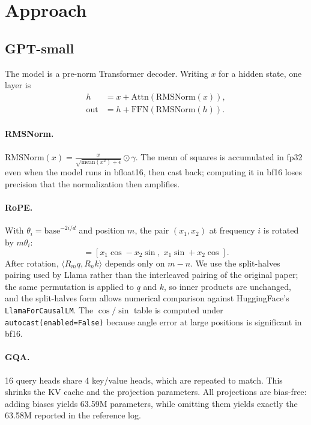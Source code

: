 \documentclass[11pt]{article}
\begin{document}
\section{Approach}

\subsection{GPT-small}

The model is a pre-norm Transformer decoder. Writing $x$ for a hidden state, one layer is
\begin{align}
h    &= x + \mathrm{Attn}(\mathrm{RMSNorm}(x)), \\
\mathrm{out} &= h + \mathrm{FFN}(\mathrm{RMSNorm}(h)).
\end{align}

\paragraph{RMSNorm.} $\mathrm{RMSNorm}(x) = \frac{x}{\sqrt{\mathrm{mean}(x^2)+\epsilon}} \odot \gamma$.
The mean of squares is accumulated in fp32 even when the model runs in bfloat16, then cast
back; computing it in bf16 loses precision that the normalization then amplifies.

\paragraph{RoPE.} With $\theta_i = \text{base}^{-2i/d}$ and position $m$, the pair
$(x_1, x_2)$ at frequency $i$ is rotated by $m\theta_i$:
\begin{equation}
[x_1', x_2'] = [x_1\cos - x_2\sin,\; x_1\sin + x_2\cos].
\end{equation}
After rotation, $\langle R_m q, R_n k\rangle$ depends only on $m-n$. We use the
split-halves pairing used by Llama rather than the interleaved pairing of the original paper;
the same permutation is applied to $q$ and $k$, so inner products are unchanged, and the
split-halves form allows numerical comparison against HuggingFace's \texttt{LlamaForCausalLM}.
The $\cos/\sin$ table is computed under \texttt{autocast(enabled=False)} because angle error
at large positions is significant in bf16.

\paragraph{GQA.} 16 query heads share 4 key/value heads, which are repeated to match. This
shrinks the KV cache and the projection parameters. All projections are bias-free: adding
biases yields 63.59M parameters, while omitting them yields exactly the 63.58M reported in the
reference log.
\end{document}
